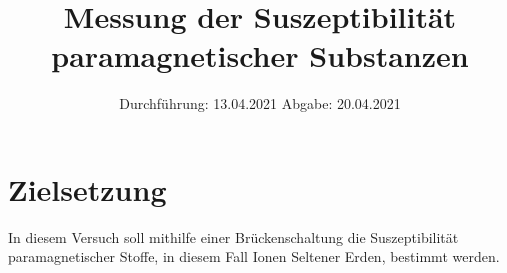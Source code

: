 

\subject{V606}
\title{Messung der Suszeptibilität paramagnetischer Substanzen}
\date{
    Durchführung: 13.04.2021
    \hspace{3em}
    Abgabe: 20.04.2021
}



\maketitle
\thispagestyle{empty}
\tableofcontents
\newpage

\section{Zielsetzung}

    In diesem Versuch soll mithilfe einer Brückenschaltung die Suszeptibilität paramagnetischer Stoffe,
    in diesem Fall Ionen Seltener Erden,
    bestimmt werden.


\clearpage


\clearpage


\clearpage


\clearpage

\printbibliography



